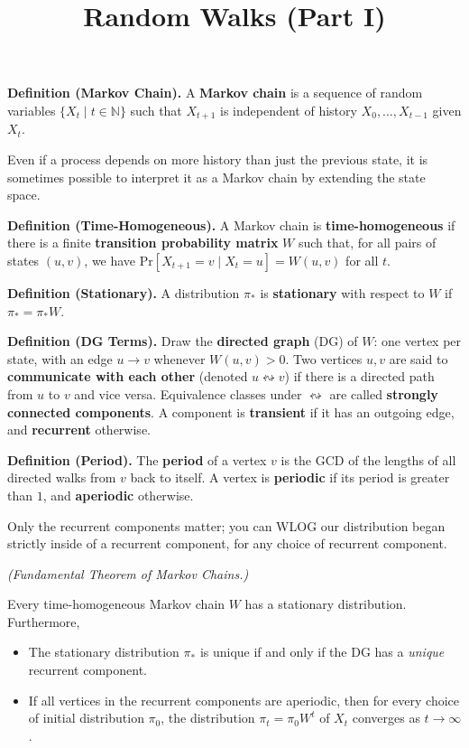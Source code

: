 \title{Random Walks (Part I)}



\textbf{Definition (Markov Chain).} A \textbf{Markov chain} is a sequence of random variables $\{X_t \mid t \in \mathbb{N}\}$ such that $X_{t + 1}$ is independent of history $X_0, \dots, X_{t - 1}$ given $X_t$.

\begin{remark}
    Even if a process depends on more history than just the previous state, it is sometimes possible to interpret it as a Markov chain by extending the state space.
\end{remark}

\textbf{Definition (Time-Homogeneous).} A Markov chain is \textbf{time-homogeneous} if there is a finite \textbf{transition probability matrix} $W$ such that, for all pairs of states $(u, v)$, we have $\mathrm{Pr}[X_{t + 1} = v \mid X_t = u] = W(u, v)$ for all $t$.

\textbf{Definition (Stationary).} A distribution $\pi_*$ is \textbf{stationary} with respect to $W$ if $\pi_* = \pi_*W$.

\textbf{Definition (DG Terms).} Draw the \textbf{directed graph} (DG) of $W$: one vertex per state, with an edge $u \to v$ whenever $W(u, v) > 0$.  Two vertices $u, v$ are said to \textbf{communicate with each other} (denoted $u \leftrightsquigarrow v$) if there is a directed path from $u$ to $v$ and vice versa.  Equivalence classes under $\leftrightsquigarrow$ are called \textbf{strongly connected components}.  A component is \textbf{transient} if it has an outgoing edge, and \textbf{recurrent} otherwise.

\textbf{Definition (Period).} The \textbf{period} of a vertex $v$ is the GCD of the lengths of all directed walks from $v$ back to itself.  A vertex is \textbf{periodic} if its period is greater than $1$, and \textbf{aperiodic} otherwise.

\begin{remark}
    Only the recurrent components matter; you can WLOG our distribution began strictly inside of a recurrent component, for any choice of recurrent component.
\end{remark}

\begin{claim}
\emph{(Fundamental Theorem of Markov Chains.)}

Every time-homogeneous Markov chain $W$ has a stationary distribution.  Furthermore,
\begin{itemize}
    \item The stationary distribution $\pi_*$ is unique if and only if the DG has a \emph{unique} recurrent component.
    \item If all vertices in the recurrent components are aperiodic, then for every choice of initial distribution $\pi_0$, the distribution $\pi_t = \pi_0W^t$ of $X_t$ converges as $t \to \infty$.
\end{itemize}
\end{claim}

